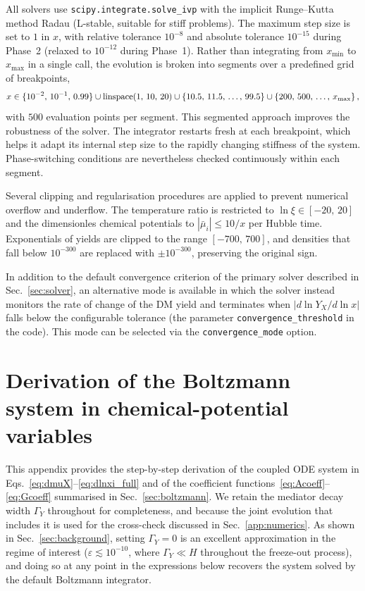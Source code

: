 \documentclass[11pt]{article}
\numberwithin{equation}{section}
\begin{document}
All solvers use \texttt{scipy.integrate.solve\_ivp} with the implicit Runge--Kutta method Radau (L-stable, suitable for stiff problems). The maximum step size is set to $1$ in $x$, with relative tolerance $10^{-8}$ and absolute tolerance $10^{-15}$ during Phase~2 (relaxed to $10^{-12}$ during Phase~1). Rather than integrating from $x_{\min}$ to $x_{\max}$ in a single call, the evolution is broken into segments over a predefined grid of breakpoints,
\begin{equation}
    x \in \{10^{-2},\, 10^{-1},\, 0.99\} \cup \mathrm{linspace}(1,\,10,\,20) \cup \{10.5,\, 11.5,\, \ldots,\, 99.5\} \cup \{200,\, 500,\, \ldots,\, x_{\rm max}\}\,,
\end{equation}
with $500$ evaluation points per segment. This segmented approach improves the robustness of the solver. The integrator restarts fresh at each breakpoint, which helps it adapt its internal step size to the rapidly changing stiffness of the system. Phase-switching conditions are nevertheless checked continuously within each segment.


Several clipping and regularisation procedures are applied to prevent numerical overflow and underflow. The temperature ratio is restricted to $\ln\xi \in [-20,\,20]$ and the dimensionles chemical potentials to $|\bar\mu_i| \leq 10/x$ per Hubble time. Exponentials of yields are clipped to the range $[-700,\,700]$, and densities that fall below $10^{-300}$ are replaced with $\pm 10^{-300}$, preserving the original sign.

In addition to the default convergence criterion of the primary solver described in Sec.~\ref{sec:solver}, an alternative mode is available in which the solver instead monitors the rate of change of the DM yield and terminates when $|d\ln Y_X/d\ln x|$ falls below the configurable tolerance (the parameter \texttt{convergence\_threshold} in the code). This mode can be selected via the \texttt{convergence\_mode} option.

\section{Derivation of the Boltzmann system in chemical-potential variables}
\label{app:derivation}

This appendix provides the step-by-step derivation of the coupled ODE system in Eqs.~\eqref{eq:dmuX}--\eqref{eq:dlnxi_full} and of the coefficient functions~\eqref{eq:Acoeff}--\eqref{eq:Gcoeff} summarised in Sec.~\ref{sec:boltzmann}. We retain the mediator decay width $\Gamma_Y$ throughout for completeness, and because the joint evolution that includes it is used for the cross-check discussed in Sec.~\ref{app:numerics}. As shown in Sec.~\ref{sec:background}, setting $\Gamma_Y = 0$ is an excellent approximation in the regime of interest ($\varepsilon \lesssim 10^{-10}$, where $\Gamma_Y \ll H$ throughout the freeze-out process), and doing so at any point in the expressions below recovers the system solved by the default Boltzmann integrator.
 
\end{document}
